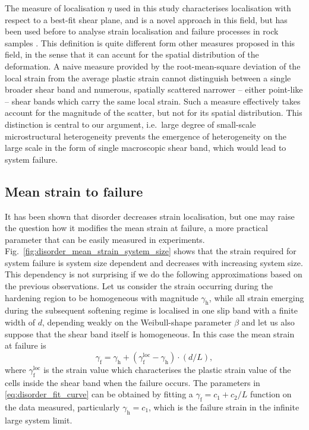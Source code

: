 The measure of localisation $\eta$ used in this study characterises localisation with respect to a best-fit shear plane, and is a novel approach in this field, but has been used before to analyse strain localisation and failure processes in rock samples \cite{PhysRevE.90.052401}. This definition is quite different form other measures proposed in this field, in the sense that it can accunt for the spatial distribution of the deformation. A naive measure provided by the root-mean-square deviation of the local strain from the average plastic strain \cite{CHENG20093253} cannot distinguish between a single broader shear band and numerous, spatially scattered narrower -- either point-like --  shear bands which carry the same local strain. Such a measure effectively takes account for the magnitude of the scatter, but not for its spatial distribution. This distinction is central to our argument, i.e.\ large degree of small-scale microstructural heterogeneity prevents the emergence of heterogeneity on the large scale in the form of single macroscopic shear band, which would lead to system failure.

\subsection{Mean strain to failure}
It has been shown that disorder decreases strain localisation, but one may raise the question how it modifies the mean strain at failure, a more practical parameter that can be easily measured in experiments. Fig.~\ref{fig:disorder_mean_strain_system_size} shows that the strain required for system failure is system size dependent and decreases with increasing system size. This dependency is not surprising if we do the following approximations based on the previous observations. Let us consider the strain occurring during the hardening region to be homogeneous with magnitude ${\gamma _{\text{h}}}$, while all strain emerging during the subsequent softening regime is localised in one slip band with a finite width of $d$, depending weakly on the Weibull-shape parameter $\beta$ and let us also suppose that the shear band itself is homogeneous. In this case the mean strain at failure is
\begin{equation} \label{eq:disorder_fit_curve}
{\gamma _{\text{f}}} = {\gamma _{\text{h}}} + \left( {\gamma _{\text{f}}^{{\text{loc}}} - {\gamma _{\text{h}}}} \right) \cdot \left( {d/L} \right),
\end{equation}
where ${\gamma _{\text{f}}^{{\text{loc}}}}$ is the strain value which characterises the plastic strain value of the cells inside the shear band when the failure occurs. The parameters in \cref{eq:disorder_fit_curve} can be obtained by fitting a ${\gamma _{\text{f}}} = {c_1} + {c_2}/L$ function on the data measured, particularly ${\gamma _{\text{h}}} = {c_1}$, which is the failure strain in the infinite large system limit.

